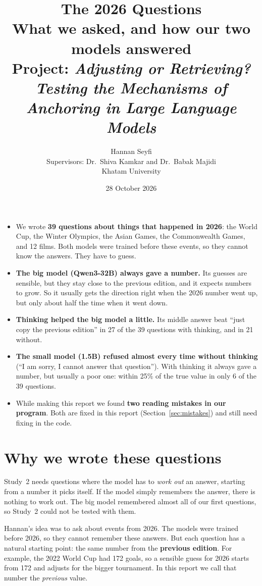 \documentclass[11pt,a4paper]{article}
\title{\textbf{The 2026 Questions}\\[4pt]
\large What we asked, and how our two models answered\\[2pt]
\normalsize Project: \emph{Adjusting or Retrieving? Testing the Mechanisms of Anchoring in Large Language Models}}
\author{Hannan Seyfi\\[6pt]
\normalsize Supervisors: Dr.\ Shiva Kamkar and Dr.\ Babak Majidi\\
\normalsize Khatam University}
\date{28 October 2026}
\begin{document}
\maketitle

\begin{keybox}
\begin{itemize}[leftmargin=1.2em]
  \item We wrote \textbf{39 questions about things that happened in 2026}: the World Cup, the Winter Olympics, the Asian Games, the Commonwealth Games, and 12 films. Both models were trained before these events, so they cannot know the answers. They have to guess.
  \item \textbf{The big model (Qwen3-32B) always gave a number.} Its guesses are sensible, but they stay close to the previous edition, and it expects numbers to grow. So it usually gets the direction right when the 2026 number went up, but only about half the time when it went down.
  \item \textbf{Thinking helped the big model a little.} Its middle answer beat ``just copy the previous edition'' in 27 of the 39 questions with thinking, and in 21 without.
  \item \textbf{The small model (1.5B) refused almost every time without thinking} (``I am sorry, I cannot answer that question''). With thinking it always gave a number, but usually a poor one: within 25\% of the true value in only 6 of the 39 questions.
  \item While making this report we found \textbf{two reading mistakes in our program}. Both are fixed in this report (Section~\ref{sec:mistakes}) and still need fixing in the code.
\end{itemize}
\end{keybox}

\section{Why we wrote these questions}

Study~2 needs questions where the model has to \emph{work out} an answer, starting from a number it picks itself. If the model simply remembers the answer, there is nothing to work out. The big model remembered almost all of our first questions, so Study~2 could not be tested with them.

Hannan's idea was to ask about events from 2026. The models were trained before 2026, so they cannot remember these answers. But each question has a natural starting point: the same number from the \textbf{previous edition}. For example, the 2022 World Cup had 172 goals, so a sensible guess for 2026 starts from 172 and adjusts for the bigger tournament. In this report we call that number the \emph{previous} value.
\end{document}
